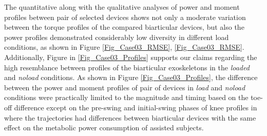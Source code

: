 \documentclass[10pt,letterpaper]{article}
\begin{document}
The quantitative along with the qualitative analyses of power and moment profiles between pair of selected devices shows not only a moderate variation between the torque profiles of the compared biarticular devices, but also the power profiles demonstrated considerably low diversity in different load conditions, as shown in Figure \ref{Fig_Case03_RMSE}, \ref{Fig_Case03_RMSE}. Additionally, Figure in \ref{Fig_Case03_Profiles} supports our claims regarding the high resemblance between profiles of the biarticular exoskeletons in the {\it loaded} and {\it noload} conditions. As shown in Figure \ref{Fig_Case03_Profiles}, the difference between the power and moment profiles of pair of devices in {\it load} and {\it noload} conditions were practically limited to the magnitude and timing based on the toe-off difference except on the pre-swing and initial-swing phases of knee profiles in where the trajectories had differences between biarticular devices with the same effect on the metabolic power consumption of assisted subjects.\\
\end{document}
